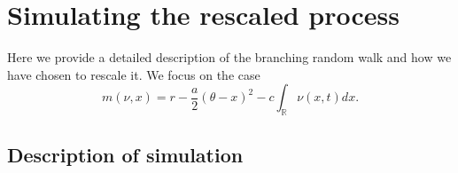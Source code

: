 \documentclass[]{article}
\begin{document}
\hypertarget{simulating-the-rescaled-process}{%
\section{\texorpdfstring{Simulating the rescaled process
\label{numerical}}{Simulating the rescaled process }}\label{simulating-the-rescaled-process}}

Here we provide a detailed description of the branching random walk and
how we have chosen to rescale it. We focus on the case \begin{equation}
m(\nu,x)=r-\frac{a}{2}(\theta-x)^2-c\int_\mathbb{R}\nu(x,t)dx.
\end{equation}

\hypertarget{description-of-simulation}{%
\subsection{\texorpdfstring{Description of simulation
\label{description}}{Description of simulation }}\label{description-of-simulation}}
\end{document}
